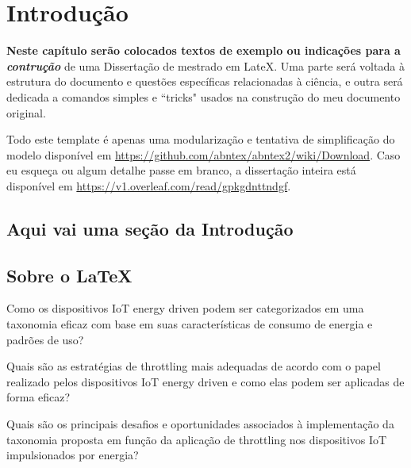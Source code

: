 \chapter{Introdução}
\label{cap:cap1}

\textbf{Neste capítulo serão colocados textos de exemplo ou indicações para a \textit{contrução}} de uma Dissertação de mestrado em LateX. Uma parte será voltada à estrutura do documento e questões específicas relacionadas à ciência, e outra será dedicada a comandos simples e ``tricks" usados na construção do meu documento original.

Todo este template é apenas uma modularização e tentativa de simplificação do modelo disponível em \url{https://github.com/abntex/abntex2/wiki/Download}. Caso eu esqueça ou algum detalhe passe em branco, a dissertação inteira está disponível em \url{https://v1.overleaf.com/read/gpkgdnttndgf}.


\section{Aqui vai uma seção da Introdução}

\section{Sobre o \LaTeX}


Como os dispositivos IoT energy driven podem ser categorizados em uma taxonomia eficaz com base em suas características de consumo de energia e padrões de uso?

Quais são as estratégias de throttling mais adequadas de acordo com o papel realizado pelos dispositivos IoT energy driven e como elas podem ser aplicadas de forma eficaz?

Quais são os principais desafios e oportunidades associados à implementação da taxonomia proposta em função da aplicação de throttling nos dispositivos IoT impulsionados por energia?